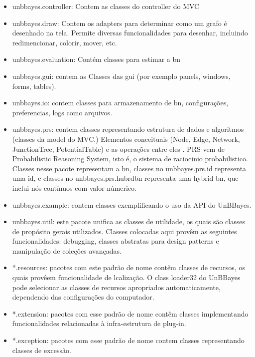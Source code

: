 \begin{itemize}
	\item unbbayes.controller: Contem as classes do controller do MVC
	
	\item unbbayes.draw: Contem os adapters para determinar como um grafo é desenhado na tela. Permite diversas funcionalidades para desenhar, incluindo redimencionar, colorir, mover, etc.
	
	\item unbbayes.evaluation: Contém classes para estimar a \gls{bn}
	

	\item unbbayes.gui: contem as Classes das \gls{gui} (por exemplo panels, windows, forms, tables).
	
	\item unbbayes.io: contem classes para armazenamento de \gls{bn}, configurações, preferencias, logs como arquivos.

	\item unbbayes.prs: contem classes representando estrutura de dados e algoritmos (classes da model do MVC.) Elementos conceituais (Node, Edge, Network, JunctionTree, PotentialTable) e as operações entre eles . PRS vem de Probabilistic Reasoning System, isto é, o sistema de raciocinio probabilistico. Classes nesse pacote representam a \gls{bn}, classes no unbbayes.prs.id representa uma \gls{id}, e classes no unbbayes.prs.hubrdbn representa uma hybrid \gls{bn}, que inclui nós contínuos com valor númerico.

	\item unbbayes.example: contem classes exemplificando o uso da API do UnBBayes.

	\item unbbayes.util: este pacote unifica as classes de utilidade, os quais são classes de propósito gerais utilizados. Classes colocadas aqui provêm as seguintes funcionalidades: debugging, classes abstratas para design patterns e manipulação de coleções avançadas.
	
	\item *.resources: pacotes com este padrão de nome contêm classes de recursos, os quais provêem funcionalidade de lcalização. O class loader32 do UnBBayes  pode selecionar as classes de recursos apropriados automaticamente, dependendo das configurações do computador.

	\item *.extension: pacotes com esse padrão de nome contêm classes implementando funcionalidades relacionadas à infra-estrutura de plug-in.

	\item *.exception: pacotes com esse padrão de nome contem classes representando classes de excessão.
\end{itemize}

